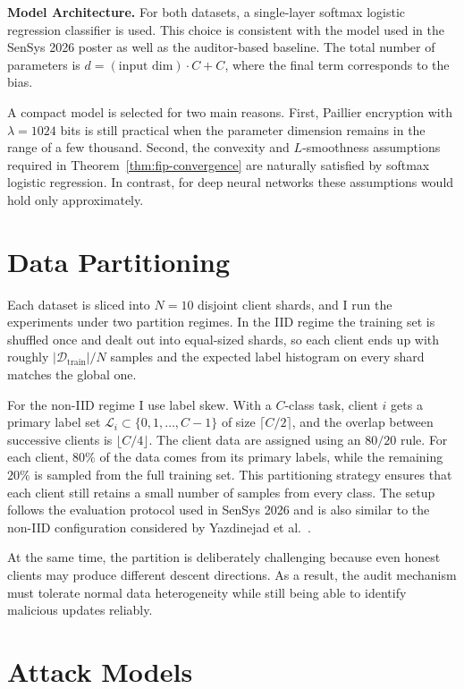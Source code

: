 \noindent\textbf{Model Architecture.} For both datasets, a single-layer softmax logistic regression classifier is used. This choice is consistent with the model used in the SenSys 2026 poster as well as the auditor-based baseline. The total number of parameters is $d=(\text{input dim})\cdot C+C$, where the final term corresponds to the bias.

A compact model is selected for two main reasons. First, Paillier encryption with $\lambda=1024$ bits is still practical when the parameter dimension remains in the range of a few thousand. Second, the convexity and $L$-smoothness assumptions required in Theorem~\ref{thm:fip-convergence} are naturally satisfied by softmax logistic regression. In contrast, for deep neural networks these assumptions would hold only approximately.

\section{Data Partitioning}
\label{sec:setup-partition}

Each dataset is sliced into $N=10$ disjoint client shards, and I run the experiments under two partition regimes. In the IID regime the training set is shuffled once and dealt out into equal-sized shards, so each client ends up with roughly $|\mathcal{D}_{\text{train}}|/N$ samples and the expected label histogram on every shard matches the global one.

For the non-IID regime I use label skew. With a $C$-class task, client $i$ gets a primary label set $\mathcal{L}_{i}\subset\{0,1,\ldots,C-1\}$ of size $\lceil C/2\rceil$, and the overlap between successive clients is $\lfloor C/4\rfloor$. The client data are assigned using an $80/20$ rule. For each client, $80\%$ of the data comes from its primary labels, while the remaining $20\%$ is sampled from the full training set. This partitioning strategy ensures that each client still retains a small number of samples from every class. The setup follows the evaluation protocol used in SenSys 2026 and is also similar to the non-IID configuration considered by Yazdinejad et al.~\cite{yazdinejad2024robust}.

At the same time, the partition is deliberately challenging because even honest clients may produce different descent directions. As a result, the audit mechanism must tolerate normal data heterogeneity while still being able to identify malicious updates reliably.

\section{Attack Models}
\label{sec:setup-attacks}

